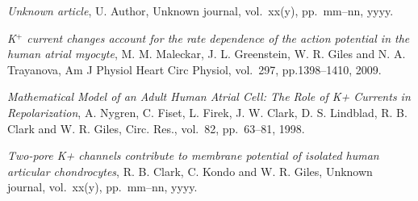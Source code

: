 \documentclass{article}
\begin{document}
\normalsize

\begin{thebibliography}{1}


\emph{Unknown article}, U. Author, Unknown journal, vol.~xx(y), pp.~mm--nn, yyyy.

\emph{K$^{+}$ current changes account for the rate dependence of the
  action potential in the human atrial myocyte}, M. M. Maleckar,
J. L. Greenstein, W. R. Giles and N. A. Trayanova, Am J Physiol Heart
Circ Physiol, vol.~297, pp.1398--1410, 2009.

\emph{Mathematical Model of an Adult Human Atrial Cell: The Role of
  K+ Currents in Repolarization}, A. Nygren, C. Fiset, L. Firek,
J. W. Clark, D. S. Lindblad, R. B. Clark and W. R. Giles, Circ. Res.,
vol.~82, pp.~63--81, 1998.

\emph{Two-pore K+ channels contribute to membrane potential of
  isolated human articular chondrocytes}, R. B. Clark, C. Kondo and
W. R. Giles, Unknown journal, vol.~xx(y), pp.~mm--nn, yyyy.

\end{thebibliography}
\end{document}
